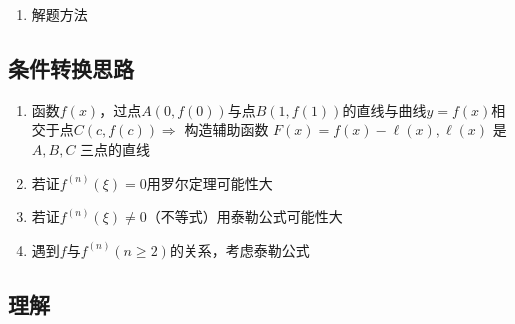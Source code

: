 \documentclass[a4paper,12pt]{article}
\begin{document}
    \begin{enumerate}
        \item 解题方法
    \end{enumerate}

    \subsection{条件转换思路}

    \begin{enumerate}
        \item 函数$f(x)$，过点$A(0, f(0))$与点$B(1, f(1))$的直线与曲线$y = f(x)$相交于点$C(c, f(c)) \Rightarrow$ 构造辅助函数 $F(x) = f(x) - \ell(x), \ell(x)$ 是$A, B, C$ 三点的直线
        \item 若证$f^{(n)}(\xi) = 0$用罗尔定理可能性大
        \item 若证$f^{(n)}(\xi) \neq 0$（不等式）用泰勒公式可能性大
        \item 遇到$f$与$f^{(n)}(n \geq 2)$的关系，考虑泰勒公式
    \end{enumerate}

    \subsection{理解}
\end{document}
